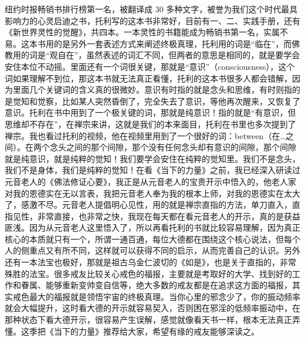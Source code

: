\begin{book}[《当下的力量》]
    纽约时报畅销书排行榜第一名，被翻译成 30 多种文字，被誉为我们这个时代最具影响力的心灵启迪之书，托利写的这本书非常好，目前有一、二、实践手册，还有《新世界灵性的觉醒》，共四本。一本灵性的书籍能成为畅销书第一名，实属不易。这本书用的是另外一套表述方式来阐述终极真理，托利用的词是“临在”，而佛教用的词是“观自在”，虽然表述的词汇不同，但两者的意思是相同的，就是要学会安住本位不动摇。里面还有一个词很关键，那就是“意识”（consciousness），这个词如果理解不到位，那这本书就无法真正看懂，托利的这本书很多人都会错解，因为里面几个关键词的含义真的很微妙。意识有时指的就是念头和思维，有时则指的是觉知和觉察，比如某人突然昏倒了，完全失去了意识，等他再次醒来，又恢复了意识。托利在书中用到了一个极关键的词，那就是纯意识！指的就是“有意识，但思维却不存在”，在禅宗来讲，这就是我们的本来面目，托利在书里也多次提到了禅宗。我也看过托利的视频，他在视频里用到了一个很好的词：between（在…之间）。在两个念头之间的那个间隙，那个没有任何念头却有意识的间隙，那个间隙就是纯意识，就是纯粹的觉知！我们要学会安住在纯粹的觉知里。我们不是念头，我们不是身体，我们是纯粹的觉知！在看《当下的力量》之前，我已经深入研读过元音老人的《佛法修证心要》，我正是从元音老人的宝贵开示中悟入的，他老人家对我的恩德实在无以言表，我把元音老人奉为我的根本上师，对我的恩德实在太大了，感激不尽。元音老人提倡明心见性，用的就是禅宗直指的方法，单刀直入，直指见性，非常直接，也非常之快，我现在每天都在看元音老人的开示，真的是获益匪浅。因为从元音老人这里悟入了，所以再看托利的书就比较容易理解，因为真正核心的本质就只有一个，所谓一通百通，每位大德都在围绕这个核心说法，但每个人的侧重点又有所不同，这样就可以获得不同的启示，从而完善自己的认识。另外还有一本法宝也极好，那就是祖古乌金仁波切的《如是》，也是关于直指的，非常殊胜的法宝。很多戒友比较关心戒色的福报，主要就是考取好的大学、找到好的工作和眷属、能够重新变帅变自信等，绝大多数的戒友都是在追求这方面的福报，其实戒色最大的福报就是领悟宇宙的终极真理。当你心里的邪念少了，你的振动频率就会大幅提升，这时看大德的开示就容易契入，否则困在邪淫的低频率振动中，在那种状态下看大德开示，很容易产生误解，感觉就像看天书一样，根本无法真正弄懂。这季把《当下的力量》推荐给大家，希望有缘的戒友能够深读之。
\end{book}
